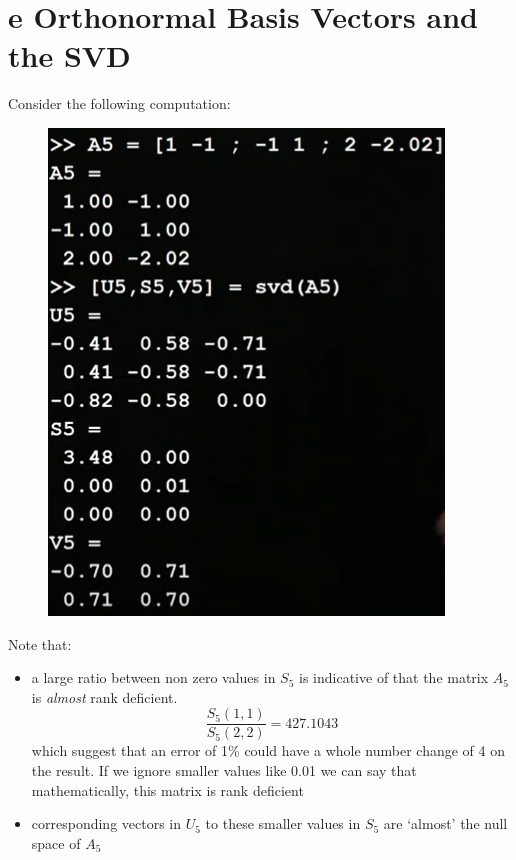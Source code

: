 \documentclass[12pt]{book}
\begin{document}
\section*{e Orthonormal Basis Vectors and the SVD}
Consider the following computation:
\begin{figure}[h]
        \centering
        \includegraphics[scale = 0.5]{./figures/Ortho1}
\end{figure}
Note that:
\begin{itemize}
        \item a large ratio between non zero values in $S_5$ is indicative of that the matrix $A_5$ is \textit{almost} rank deficient.
                \[\frac{S_5(1,1)}{S_5(2,2)} = 427.1043\]
                which suggest that an error of 1\% could have a whole number change of 4 on the result.
                If we ignore smaller values like 0.01 we can say that mathematically, this matrix is rank deficient
        \item corresponding vectors in $U_5$ to these smaller values in $S_5$ are `almost' the null space of $A_5$
\end{itemize}
\end{document}

